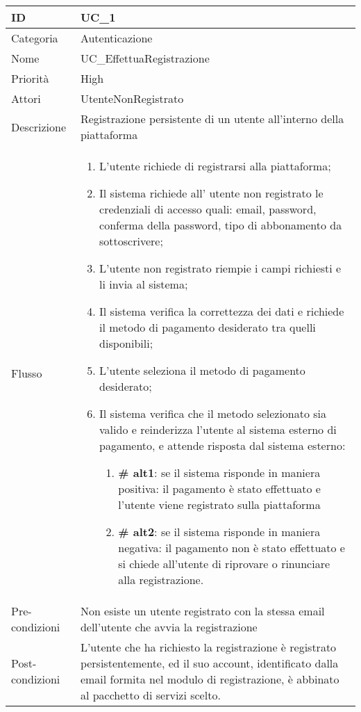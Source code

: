 \begin{center}
\begin{tabular}{ |p{2cm}|p{13cm}|  }
\hline
ID & UC\_1 \\\hline
Categoria & Autenticazione \\\hline
Nome & UC\_EffettuaRegistrazione \\\hline
Priorità & High \\\hline
Attori &  UtenteNonRegistrato \\\hline
Descrizione & Registrazione persistente di un utente all'interno della piattaforma \\\hline
Flusso &  	\begin{enumerate}
			\item L'utente richiede di registrarsi alla piattaforma;
			\item Il sistema richiede all' utente non registrato le credenziali di accesso quali: email, password, conferma della password, tipo di abbonamento da sottoscrivere;
			\item L'utente non registrato riempie i campi richiesti e li invia al sistema;
			\item Il sistema verifica la correttezza dei dati e richiede il metodo di pagamento desiderato tra quelli disponibili;
			\item L'utente seleziona il metodo di pagamento desiderato;
			\item Il sistema verifica che il metodo selezionato sia valido e reinderizza l'utente al sistema esterno di pagamento, e attende risposta dal sistema esterno:
			\begin{enumerate}[  ]
				\item \textbf{\# alt1}: se il sistema risponde in maniera positiva: il pagamento è stato effettuato e l'utente viene registrato sulla piattaforma 
				\item \textbf{\# alt2}: se il sistema risponde in maniera negativa: il pagamento non è stato effettuato e si chiede all'utente di riprovare o rinunciare alla registrazione.
			\end{enumerate}
		\end{enumerate}\\\hline
Pre-condizioni &  Non esiste un utente registrato con la stessa email dell'utente che avvia la registrazione\\\hline
Post-condizioni &  L'utente che ha richiesto la registrazione è registrato persistentemente, ed il suo account, identificato dalla email formita nel modulo di registrazione, è abbinato al pacchetto di servizi scelto.\\\hline
\end{tabular}
\label{table_use_case:1}\newline


\end{center}

